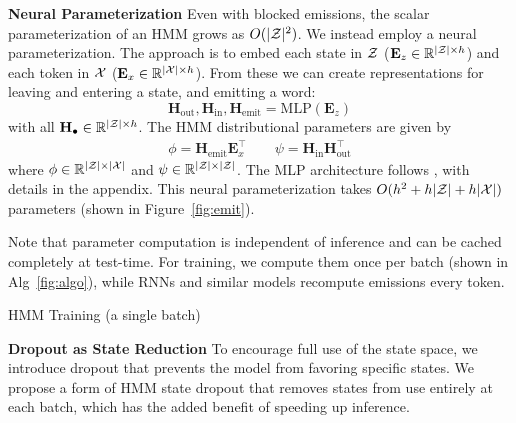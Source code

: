 \documentclass[11pt,a4paper]{article}
\begin{document}
\vspace{0.2cm}

\noindent
\textbf{Neural Parameterization}
Even with blocked emissions, the scalar parameterization of an HMM grows as $O(|\mathcal{Z}|^2)$.
We instead employ a neural parameterization.
The approach is to embed each state in $\mathcal{Z}$ ($\mathbf{E}_z \in \mathbb{R}^{|\mathcal{Z}| \times h}$)
and each token in $\cal X$ ($\mathbf{E}_x \in \mathbb{R}^{|\mathcal{X}| \times h}$).
From these we can create representations for leaving and entering a state,
and emitting a word: 
\[ \mathbf{H}_{\textrm{out}},\mathbf{H}_{\textrm{in}},\mathbf{H}_\textrm{emit}
 = \text{MLP}( \mathbf{E}_z ) \] 
with all $\mathbf{H}_{\bullet} \in \mathbb{R}^{|\mathcal{Z}|\times h}$.
The HMM distributional parameters are given by
\begin{equation}
\begin{aligned}
\phi = \mathbf{H}_\textrm{emit}\mathbf{E}_x ^\top \qquad 
\psi = \mathbf{H}_\textrm{in}\mathbf{H}_\textrm{out}^\top
\end{aligned}
\end{equation}
where $\phi \in \mathbb{R}^{|\mathcal{Z}|\times|\mathcal{X}|}$ and
$\psi \in \mathbb{R}^{|\mathcal{Z}|\times|\mathcal{Z}|}$.
The MLP architecture follows \cite{kim2019cpcfg}, with details in the appendix.
This neural parameterization takes $O(h^2 + h|\mathcal{Z}| + h|\mathcal{X}|)$ parameters
(shown in Figure~\ref{fig:emit}).

Note that parameter computation is independent of inference
and can be cached completely at test-time.
For training, we compute them once per batch (shown in Alg~\ref{fig:algo}),
while RNNs and similar models recompute emissions every token.

\begin{algorithm}[t]
\begin{algorithmic}
    \EndFor
\end{algorithmic}
\caption{
\label{fig:algo}
HMM Training (a single batch)
}
\end{algorithm}

\vspace{0.2cm}

\noindent
\textbf{Dropout as State Reduction}
To encourage full use of the state space,
we introduce dropout that prevents the model from favoring specific states. 
We propose a form of HMM state dropout that removes states from use entirely
at each batch,
which has the added benefit of speeding up inference.
\end{document}
